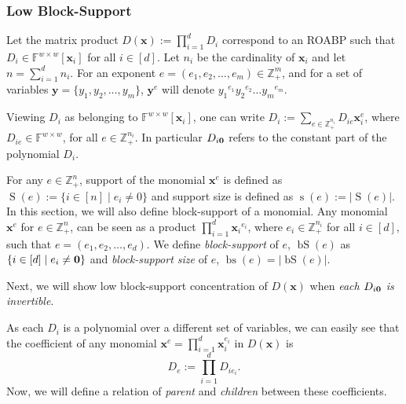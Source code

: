 \documentclass[final,oneeqnum, onethmnum, onefignum]{siamltex1213}
\newcommand{\Zp}{\mathbb{Z}_+}
\newcommand{\F}{\mathbb F}
\newcommand{\abs}[1]{\lvert #1 \rvert}
\DeclareMathOperator{\Supp}{S} %
\DeclareMathOperator{\suppo}{s} %
\DeclareMathOperator{\bs}{bs}
\DeclareMathOperator{\bS}{bS}
\newcommand{\xe}{\mathbf{x}^e}
\newcommand{\xei}{ \mathbf{x}_i^{e_i} }
\renewcommand{\o}[1]{\overline{#1}}
\begin{document}

\subsubsection{Low Block-Support} 
Let the matrix product $D(\mathbf{x}) := \prod_{i=1}^{d} D_i$
correspond to an ROABP such that
$D_i \in \F^{w \times w}[\mathbf{x}_i]$ for all $i \in [d]$.
Let $n_i$ be the cardinality of $\mathbf{x}_i$ and
let $n = \sum_{i=1}^d n_i$. 
For an exponent $e = (e_1, e_2, \dots, e_m) \in \Zp^m$, 
and for a set of variables $\mathbf{y}= \{y_1,y_2, \dots, y_m\}$,
${\mathbf{y}}^e$ will denote ${{y}_1}^{e_1} {y_2}^{e_2} \dots {y_m}^{e_m}$.

Viewing $D_i$ as belonging to $\F^{w \times w}[{\mathbf{x}}_i]$,
one can write $D_i := \sum_{e \in \Zp^{n_i}} D_{ie} {\mathbf{x}}_i^e$,
where $D_{ie} \in \F^{w \times w}$, for all $e \in \Zp^{n_i}$.
In particular $D_{i {\bf 0}}$ refers to
the constant part of the polynomial $D_i$. 

For any $e \in \Zp^n$, 
support of the monomial $\mathbf{x}^e$ is defined as 
$\Supp(e) := \{i \in [n] \mid e_i \neq 0 \}$
and support size is defined as $\suppo(e) := \abs{\Supp(e)}$.
In this section, we will also define block-support
of a monomial. 
Any monomial $\mathbf{x}^e$ for $e \in \Zp^n$, 
can be seen as a product $\prod_{i=1}^d {\mathbf{x}_i}^{e_i}$,
where $e_i \in \Zp^{n_i}$ for all $i \in [d]$,
such that $e = (e_1, e_2, \dots, e_d)$.
We define {\em block-support} of $e$, $\bS(e)$  as
$\{i \in [d] \mid e_i \neq {\bf 0} \}$ and 
{\em block-support size} of $e$, $\bs(e) = \abs{\bS(e)}$.
 
Next, we will show low block-support concentration 
of $D(\mathbf{x})$ when {\em each $D_{i {\bf 0}}$ is invertible}. 

As each $D_i$ is a polynomial over a different set of variables,
we can easily see that the coefficient of any 
monomial $\xe = \prod_{i=1}^{d} \xei$ in $D(\mathbf{x})$
is 
\begin{equation}
\label{eq:coeffSplits}
D_e := \prod_{i=1}^d D_{ie_i}.
\end{equation}
Now, we will define a relation of {\em parent} and {\em children} 
between these coefficients. 
\end{document}
